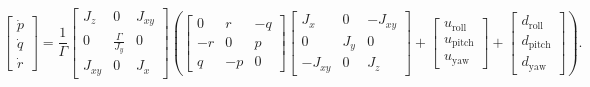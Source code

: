 \documentclass[3p]{elsarticle}
\begin{document}
\begin{equation}
    \begin{bmatrix}
    \dot{p} \\
    \dot{q} \\
    \dot{r}
    \end{bmatrix} = \frac{1}{\Gamma} \begin{bmatrix}
    J_z & 0 & J_{xy} \\
    0 & \frac{\Gamma}{J_y} & 0 \\
    J_{xy} & 0 & J_x
    \end{bmatrix} \left(
    \begin{bmatrix}
    0 & r & -q \\
    -r & 0 & p \\
    q & -p & 0
    \end{bmatrix} \begin{bmatrix}
    J_x & 0 & -J_{xy} \\
    0 & J_y & 0 \\
    -J_{xy} & 0 & J_z
    \end{bmatrix} +
    \begin{bmatrix}
    u_{\text{roll}} \\
    u_{\text{pitch}} \\
    u_{\text{yaw}}
    \end{bmatrix} + \begin{bmatrix}
    d_{\text{roll}} \\
    d_{\text{pitch}} \\
    d_{\text{yaw}}
    \end{bmatrix}
    \right).
\end{equation}
\end{document}
